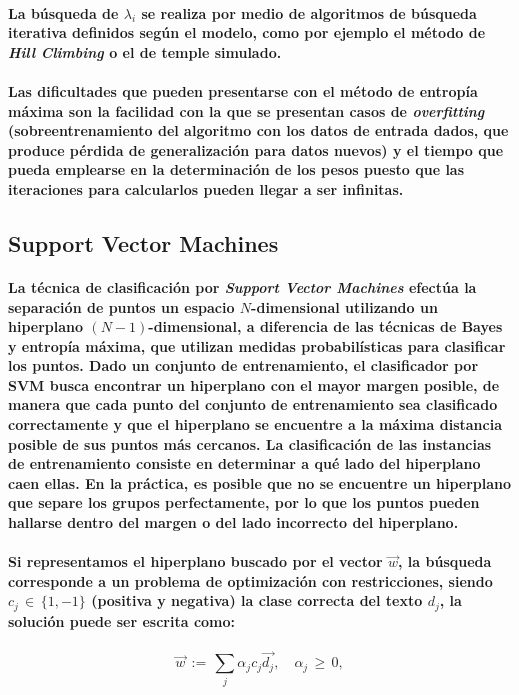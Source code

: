 \paragraph{La b\'usqueda de $\lambda_{i}$ se realiza por medio de algoritmos de b\'usqueda iterativa definidos seg\'un el modelo, como por ejemplo el m\'etodo de \textit{Hill Climbing} o el de temple simulado.}

\paragraph{Las dificultades que pueden presentarse con el m\'etodo de entrop\'ia m\'axima son la facilidad con la que se presentan casos de \textit{overfitting} (sobreentrenamiento del algoritmo con los datos de entrada dados, que produce p\'erdida de generalizaci\'on para datos nuevos) y el tiempo que pueda emplearse en la determinaci\'on de los pesos puesto que las iteraciones para calcularlos pueden llegar a ser infinitas.}

\subsection{Support Vector Machines}
\paragraph{La t\'ecnica de clasificaci\'on por \textit{Support Vector Machines} efect\'ua la separaci\'on de puntos un espacio $N$-dimensional utilizando un hiperplano $(N-1)$-dimensional, a diferencia de las t\'ecnicas de Bayes y entrop\'ia m\'axima, que utilizan medidas probabil\'isticas para clasificar los puntos. Dado un conjunto de entrenamiento, el clasificador por SVM busca encontrar un hiperplano con el mayor margen posible, de manera que cada punto del conjunto de entrenamiento sea clasificado correctamente y que el hiperplano se encuentre a la m\'axima distancia posible de sus puntos m\'as cercanos. La clasificaci\'on de las instancias de entrenamiento consiste en determinar a qu\'e lado del hiperplano caen ellas. En la pr\'actica, es posible que no se encuentre un hiperplano que separe los grupos perfectamente, por lo que los puntos pueden hallarse dentro del margen o del lado incorrecto del hiperplano.}
\paragraph{Si representamos el hiperplano buscado por el vector $\vec{w}$, la b\'usqueda corresponde a un problema de optimizaci\'on con restricciones, siendo $c_{j} \, \in \, \{1,-1\}$ (positiva y negativa) la clase correcta del texto $d_{j}$, la soluci\'on puede ser escrita como:}
$$ \vec{w} \, := \, \sum_{j} \alpha_{j}c_{j}\vec{d_{j}}, \quad \alpha_{j} \, \geq \, 0, $$
